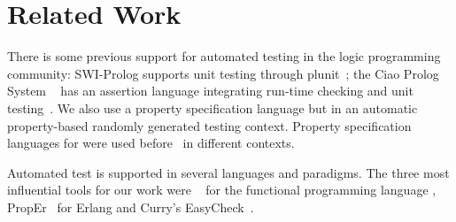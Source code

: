 
\section{Related Work} 
\label{sec:rel-work}


%
There is some previous support for automated testing in the logic programming
community:
%
{\sf SWI-Prolog} supports unit testing through {\sf plunit}~\cite{swi-prolog};
%
the {\sf Ciao Prolog System} ~\cite{ciao-prolog} has an assertion language
integrating run-time checking and unit testing~\cite{ciao-assert-unit}.
%
We also use a property specification language but in an
automatic property-based randomly generated testing context.
%
Property specification languages for \Prolog{} were used
before~\cite{ciao-assert-unit,Deville1990logprog,somogyi1995mercury} in
different contexts.


Automated test is supported in several languages and
paradigms.
%
The three most influential tools for our work were \QuickCheck~\cite{quickcheck} for
the functional programming language \Haskell, {\sf PropEr}~\cite{papadakis2011proper} for %
{\sf Erlang}
and {\sf Curry}'s {\sf EasyCheck}~\cite{christiansen2008easycheck}.


